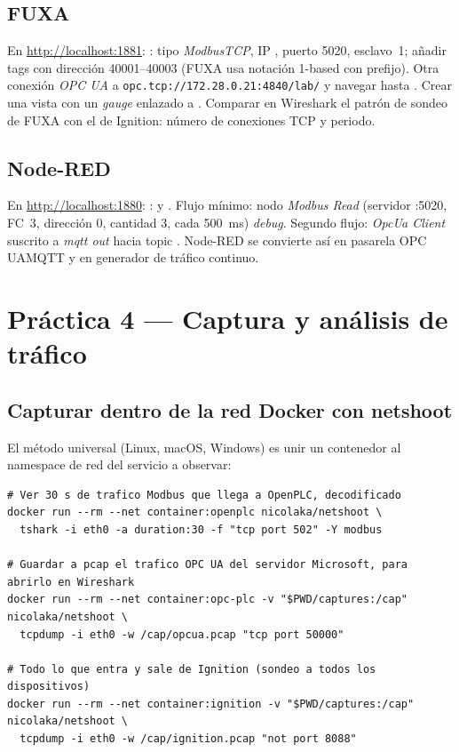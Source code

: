 \subsection{FUXA}

En \url{http://localhost:1881}: : tipo \emph{ModbusTCP}, IP , puerto 5020, esclavo~1; añadir tags con dirección 40001--40003 (FUXA usa notación 1-based con prefijo). Otra conexión \emph{OPC UA} a \nolinkurl{opc.tcp://172.28.0.21:4840/lab/} y navegar hasta . Crear una vista con un \emph{gauge} enlazado a . Comparar en Wireshark el patrón de sondeo de FUXA con el de Ignition: número de conexiones TCP y periodo.

\subsection{Node-RED}

En \url{http://localhost:1880}: :  y . Flujo mínimo: nodo \emph{Modbus Read} (servidor :5020, FC~3, dirección 0, cantidad 3, cada 500~ms) \ra{} \emph{debug}. Segundo flujo: \emph{OpcUa Client} suscrito a  \ra{} \emph{mqtt out} hacia  topic . Node-RED se convierte así en pasarela OPC UA\ra{}MQTT y en generador de tráfico continuo.

\section{Práctica 4 --- Captura y análisis de tráfico}
\label{sec:prac-captura}

\subsection{Capturar dentro de la red Docker con netshoot}

El método universal (Linux, macOS, Windows) es unir un contenedor  al namespace de red del servicio a observar:

\begin{lstlisting}[style=bash]
# Ver 30 s de trafico Modbus que llega a OpenPLC, decodificado
docker run --rm --net container:openplc nicolaka/netshoot \
  tshark -i eth0 -a duration:30 -f "tcp port 502" -Y modbus

# Guardar a pcap el trafico OPC UA del servidor Microsoft, para abrirlo en Wireshark
docker run --rm --net container:opc-plc -v "$PWD/captures:/cap" nicolaka/netshoot \
  tcpdump -i eth0 -w /cap/opcua.pcap "tcp port 50000"

# Todo lo que entra y sale de Ignition (sondeo a todos los dispositivos)
docker run --rm --net container:ignition -v "$PWD/captures:/cap" nicolaka/netshoot \
  tcpdump -i eth0 -w /cap/ignition.pcap "not port 8088"
\end{lstlisting}


